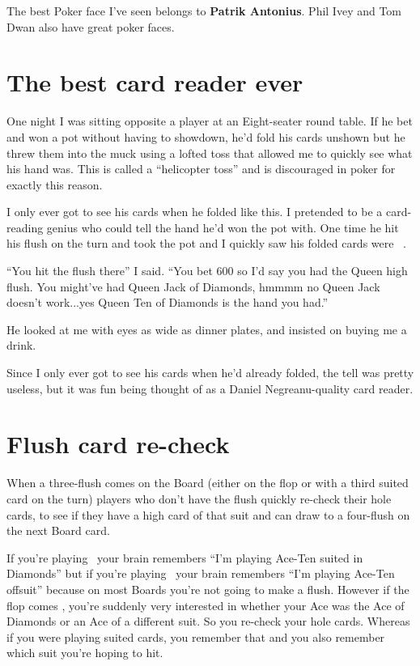 The best Poker face I've seen belongs to \textbf{Patrik
Antonius}. Phil Ivey and Tom Dwan also have great poker faces.

\section{The best card reader ever}

One night I was sitting opposite a player at an Eight-seater round
table. If he bet and won a pot without having to showdown, he'd
fold his cards unshown but he threw them into the muck using a lofted toss
that allowed me to quickly see what his hand was. This is called
a ``helicopter toss'' and is discouraged in poker for exactly this reason.

I only ever got to see his cards when he folded like this. I pretended
to be a card-reading genius who could tell the hand he'd won the pot
with. One time he hit his flush on the turn and took the pot and I
quickly saw his folded cards were \Qd\tend\ .

``You hit the flush there'' I said. ``You bet 600 so I'd
say you had the Queen high flush. You might've had Queen Jack of Diamonds,
hmmmm no Queen Jack doesn't work...yes Queen Ten of Diamonds is the hand
you had.''

He looked at me with eyes as wide as dinner plates, and insisted on buying
me a drink.

Since I only ever got to see his cards when he'd already folded, the tell
was pretty useless, but it was fun being thought of as a Daniel
Negreanu-quality card reader.


\section{Flush card re-check}

When a three-flush comes on the Board (either on the flop or with
a third suited card on the turn) players who don't have the flush
quickly re-check their hole cards, to see if they have a high card
of that suit and can draw to a four-flush on the next Board card.

If you're playing \Ad\tend\ your brain remembers ``I'm playing Ace-Ten
suited in Diamonds'' but if you're playing \Ad\tens\ your brain remembers
``I'm playing Ace-Ten offsuit'' because on most Boards you're not going to
make a flush. However if the flop comes \Kd\eigd\sevd, you're suddenly
very interested in whether your Ace was the Ace of Diamonds or an Ace of
a different suit. So you re-check your hole cards. Whereas if you were
playing suited cards, you remember that and you also remember which suit
you're hoping to hit.

